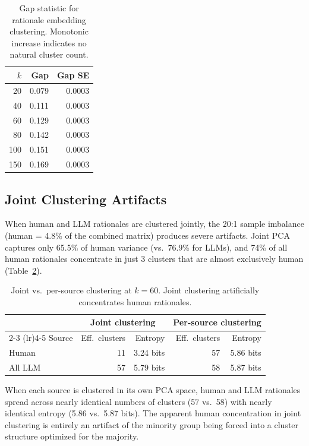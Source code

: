 \documentclass[11pt,a4paper]{article}
\begin{document}
\begin{table}[H]
\centering
\caption{Gap statistic for rationale embedding clustering. Monotonic increase indicates no natural cluster count.}
\label{tab:gap}
\begin{tabular}{rrr}
\toprule
$k$ & Gap & Gap SE \\
\midrule
20  & 0.079 & 0.0003 \\
40  & 0.111 & 0.0003 \\
60  & 0.129 & 0.0003 \\
80  & 0.142 & 0.0003 \\
100 & 0.151 & 0.0003 \\
150 & 0.169 & 0.0003 \\
\bottomrule
\end{tabular}
\end{table}

\subsection{Joint Clustering Artifacts}

When human and LLM rationales are clustered jointly, the 20:1 sample imbalance (human = 4.8\% of the combined matrix) produces severe artifacts. Joint PCA captures only 65.5\% of human variance (vs.\ 76.9\% for LLMs), and 74\% of all human rationales concentrate in just 3 clusters that are almost exclusively human (Table~\ref{tab:joint_artifact}).

\begin{table}[H]
\centering
\caption{Joint vs.\ per-source clustering at $k = 60$. Joint clustering artificially concentrates human rationales.}
\label{tab:joint_artifact}
\begin{tabular}{lrrrr}
\toprule
 & \multicolumn{2}{c}{Joint clustering} & \multicolumn{2}{c}{Per-source clustering} \\
\cmidrule(lr){2-3} \cmidrule(lr){4-5}
Source & Eff.\ clusters & Entropy & Eff.\ clusters & Entropy \\
\midrule
Human   & 11  & 3.24 bits & 57 & 5.86 bits \\
All LLM & 57  & 5.79 bits & 58 & 5.87 bits \\
\bottomrule
\end{tabular}
\end{table}

When each source is clustered in its own PCA space, human and LLM rationales spread across nearly identical numbers of clusters (57 vs.\ 58) with nearly identical entropy (5.86 vs.\ 5.87 bits). The apparent human concentration in joint clustering is entirely an artifact of the minority group being forced into a cluster structure optimized for the majority.
\end{document}
